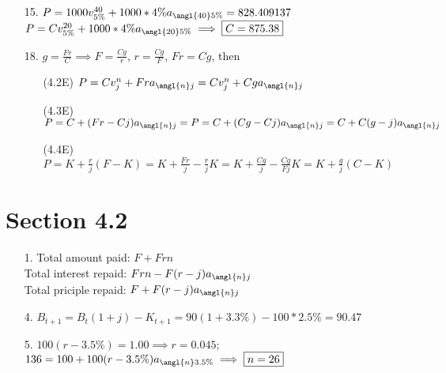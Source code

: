 \documentclass{article}
\begin{document}
\begin{itemize}
	\item [15.] $P=1000v_{5\%}^{40}+1000*4\%a_{\angl{40}5\%}=828.409137$\\$P=Cv_{5\%}^{20}+1000*4\%a_{\angl{20}5\%} \implies \boxed{C=875.38}$
	\item [18.] $g=\frac{Fr}{C} \implies F=\frac{Cg}{r}$, $r=\frac{Cg}{F}$, $Fr=Cg$, then \begin{itemize}
		      \item [(4.2E)] $P=Cv_j^n+Fra_{\angl{n}j}=Cv_j^n+Cga_{\angl{n}j}$
		      \item [(4.3E)] $P=C+(Fr-Cj)a_{\angl{n}j}=P=C+(Cg-Cj)a_{\angl{n}j}=C+C(g-j)a_{\angl{n}j}$
		      \item [(4.4E)] $P=K+\frac{r}{j}(F-K)=K+\frac{Fr}{j}-\frac{r}{j}K=K+\frac{Cg}{j}-\frac{Cg}{Fj}K=K+\frac{g}{j}(C-K)$
	      \end{itemize}
\end{itemize}

\section*{Section 4.2}
\begin{itemize}
	\item [1.] Total amount paid: $F+Frn$\\Total interest repaid: $Frn-F(r-j)a_{\angl{n}j}$\\Total priciple repaid: $F+F(r-j)a_{\angl{n}j}$
	\item [4.] $B_{t+1}=B_t(1+j)-K_{t+1}=90(1+3.3\%)-100*2.5\%=\boxed{90.47}$
	\item [5.] $100(r-3.5\%)=1.00 \implies r=0.045$; $136=100+100(r-3.5\%)a_{\angl{n}3.5\%} \implies \boxed{n=26}$
\end{itemize}
\end{document}

